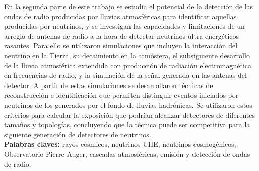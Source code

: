 \begin{titlepage}
En la segunda parte de este trabajo se estudia el potencial de la detecci\'on de las ondas de radio producidas por lluvias atmosf\'ericas para identificar aquellas producidas por neutrinos, y se investigan las capacidades y limitaciones de un arreglo de antenas de radio a la hora de detectar neutrinos ultra energéticos rasantes. 
Para ello se utilizaron simulaciones que incluyen la interacción del neutrino en la Tierra, su decaimiento en la atmósfera, el subsiguiente desarrollo de la lluvia atmosférica extendida con producci\'on de radiaci\'on electromagn\'etica en frecuencias de radio, y la simulación de la señal generada en las antenas del detector.
A partir de estas simulaciones se desarrollaron técnicas de reconstrucción e identificación que permiten distinguir eventos iniciados por neutrinos de los generados por el fondo de lluvias hadrónicas.
Se utilizaron estos criterios para calcular la exposición que podrían alcanzar detectores de diferentes tamaños y topologías, concluyendo que la técnica puede ser competitiva para la siguiente generación de detectores de neutrinos.
\\[0.2cm]

\noindent
\textbf{Palabras claves: } rayos cósmicos, neutrinos UHE, neutrinos cosmogénicos, Observatorio Pierre Auger, cascadas atmosf\'ericas, emisión y detección de ondas de radio.\\

\end{titlepage}